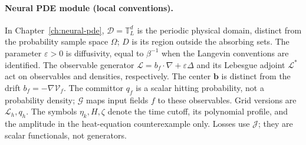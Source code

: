 \paragraph{Neural PDE module (local conventions).}
In Chapter~\ref{ch:neural-pde}, $\mathcal D=\mathbb T_L^d$ is the periodic physical domain, distinct from the
probability sample space $\Omega$; $D$ is its region outside the absorbing sets. The parameter $\varepsilon>0$
is diffusivity, equal to $\beta^{-1}$ when the Langevin conventions are identified.
The observable generator $\mathcal L=b_f\cdot\nabla+\varepsilon\Delta$ and its Lebesgue adjoint $\mathcal L^*$
act on observables and densities, respectively. The center $\boldsymbol b$ is distinct from the drift
$b_f=-\nabla\mathcal V_f$. The committor $q_f$ is a scalar hitting probability, not a probability density;
$\mathcal G$ maps input fields $f$ to these observables. Grid versions are $\mathcal L_h,q_h$.
The symbols $\eta_k,H,\zeta$ denote the time cutoff, its polynomial profile, and the amplitude in the heat-equation
counterexample only. Losses use $\mathcal J$; they are scalar functionals, not generators.
